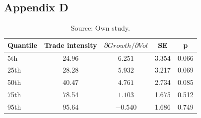 \subsection{Appendix D}\label{appendD}

\begin{table}[H]
    \centering
    \vspace{\baselineskip}
    \caption{Marginal effect of volatility on growth}
    \begin{tabular}{lcccc}
        \toprule
        \textbf{Quantile} & \textbf{Trade intensity} &
        $\partial\mathit{Growth}/\partial\mathit{Vol}$ & \textbf{SE} & \textbf{p} \\
        \midrule
        5th   & 24.96 & $6.251$   & 3.354 & 0.066 \\
        25th  & 28.28 & $5.932$   & 3.217 & 0.069 \\
        50th  & 40.47 & $4.761$   & 2.734 & 0.085 \\
        75th  & 78.54 & $1.103$   & 1.675 & 0.512 \\
        95th  & 95.64 & $-0.540$  & 1.686 & 0.749 \\
        \bottomrule
    \end{tabular}
    \vspace{\baselineskip}
    \caption*{\footnotesize Source: Own study.}
    \label{tab:mar_eff_vol}
\end{table}
